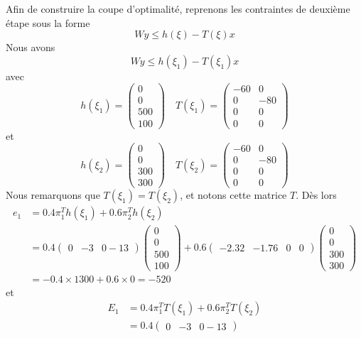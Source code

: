\documentclass[12pt]{book}
\begin{document}
\begin{enumerate}
Afin de construire la coupe d'optimalité, reprenons les contraintes de deuxième étape sous la forme
$$
Wy \leq h(\xi)-T(\xi)x
$$
Nous avons
$$
Wy \leq h(\xi_1) - T(\xi_1)x
$$
avec
$$
h(\xi_1) = \begin{pmatrix} 0 \\ 0 \\ 500 \\ 100 \end{pmatrix} \quad 
T(\xi_1) = \begin{pmatrix} -60 & 0 \\ 0 & -80 \\ 0 & 0 \\ 0 & 0  \end{pmatrix}
$$
et
$$
h(\xi_2) = \begin{pmatrix} 0 \\ 0 \\ 300 \\ 300 \end{pmatrix} \quad 
T(\xi_2) = \begin{pmatrix} -60 & 0 \\ 0 & -80 \\ 0 & 0 \\ 0 & 0  \end{pmatrix}
$$
Nous remarquons que $T(\xi_1) = T(\xi_2)$, et notons cette matrice $T$.
Dès lors
\begin{align*}
e_1 &= 0.4\pi_1^Th(\xi_1) + 0.6\pi_2^Th(\xi_2) \\
&= 0.4  \begin{pmatrix} 0 & -3 & 0 -13 \end{pmatrix} \begin{pmatrix} 0 \\ 0 \\ 500 \\ 100 \end{pmatrix} + 
0.6  \begin{pmatrix} -2.32 & -1.76 & 0 & 0 \end{pmatrix} \begin{pmatrix} 0 \\ 0 \\ 300 \\ 300 \end{pmatrix} \\
&= -0.4\times1300 + 0.6\times 0 = -520
\end{align*}
et
\begin{align*}
E_1 &= 0.4\pi_1^T T(\xi_1) + 0.6\pi_2^T T(\xi_2) \\
& = 0.4  \begin{pmatrix} 0 & -3 & 0 -13 \end{pmatrix}

\end{align*}
\end{enumerate}
\end{document}
